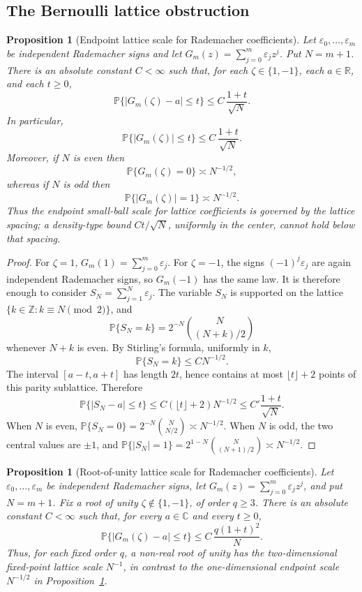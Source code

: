 \documentclass[11pt]{amsart}
\numberwithin{equation}{section}
\newtheorem{proposition}[theorem]{Proposition}
\theoremstyle{definition}
\theoremstyle{remark}
\newcommand{\C}{\mathbb C}
\newcommand{\Prob}{\mathbb P}
\newcommand{\abs}[1]{\left\lvert #1\right\rvert}
\begin{document}
\subsection{The Bernoulli lattice obstruction}
\begin{proposition}[Endpoint lattice scale for Rademacher coefficients]\label{prop:rademacher-endpoint}
Let \(\varepsilon_0,\ldots,\varepsilon_m\) be independent Rademacher signs and
let \(G_m(z)=\sum_{j=0}^m\varepsilon_jz^j\).  Put \(N=m+1\).  There is an
absolute constant \(C<\infty\) such that, for each \(\zeta\in\{1,-1\}\), each
\(a\in\mathbb R\), and each \(t\ge0\),
\[
  \Prob\{\abs{G_m(\zeta)-a}\le t\}\le C\,\frac{1+t}{\sqrt N}.
\]
In particular,
\[
  \Prob\{\abs{G_m(\zeta)}\le t\}\le C\,\frac{1+t}{\sqrt N}.
\]
Moreover, if \(N\) is even then
\[
  \Prob\{G_m(\zeta)=0\}\asymp N^{-1/2},
\]
whereas if \(N\) is odd then
\[
  \Prob\{\abs{G_m(\zeta)}=1\}\asymp N^{-1/2}.
\]
Thus the endpoint small-ball scale for lattice coefficients is governed by the
lattice spacing; a density-type bound \(Ct/\sqrt N\), uniformly in the center,
cannot hold below that spacing.
\end{proposition}

\begin{proof}
For \(\zeta=1\), \(G_m(1)=\sum_{j=0}^m\varepsilon_j\).  For \(\zeta=-1\), the
signs \((-1)^j\varepsilon_j\) are again independent Rademacher signs, so
\(G_m(-1)\) has the same law.  It is therefore enough to consider
\(S_N=\sum_{j=1}^N\varepsilon_j\).  The variable \(S_N\) is supported on the
lattice \(\{k\in\mathbb Z:k\equiv N \pmod 2\}\), and
\[
  \Prob\{S_N=k\}=2^{-N}\binom{N}{(N+k)/2}
\]
whenever \(N+k\) is even.  By Stirling's formula, uniformly in \(k\),
\[
  \Prob\{S_N=k\}\le C N^{-1/2}.
\]
The interval \([a-t,a+t]\) has length \(2t\), hence contains at most
\(\lfloor t\rfloor+2\) points of this parity sublattice.  Therefore
\[
  \Prob\{\abs{S_N-a}\le t\}
  \le C(\lfloor t\rfloor+2)N^{-1/2}
  \le C'\frac{1+t}{\sqrt N}.
\]
When \(N\) is even,
\(\Prob\{S_N=0\}=2^{-N}\binom{N}{N/2}\asymp N^{-1/2}\).  When \(N\) is odd,
the two central values are \(\pm1\), and
\(\Prob\{|S_N|=1\}=2^{1-N}\binom{N}{(N+1)/2}\asymp N^{-1/2}\).
\end{proof}

\begin{proposition}[Root-of-unity lattice scale for Rademacher coefficients]\label{prop:rademacher-root-unity}
Let \(\varepsilon_0,\ldots,\varepsilon_m\) be independent Rademacher signs,
let \(G_m(z)=\sum_{j=0}^m\varepsilon_jz^j\), and put \(N=m+1\).  Fix a
root of unity \(\zeta\notin\{1,-1\}\), of order \(q\ge3\).  There is an
absolute constant \(C<\infty\) such that, for every \(a\in\C\) and every
\(t\ge0\),
\[
  \Prob\{\abs{G_m(\zeta)-a}\le t\}
  \le C\,\frac{q(1+t)^2}{N}.
\]
Thus, for each fixed order \(q\), a non-real root of unity has the
two-dimensional fixed-point lattice scale \(N^{-1}\), in contrast to the
one-dimensional endpoint scale \(N^{-1/2}\) in
Proposition~\ref{prop:rademacher-endpoint}.
\end{proposition}
\end{document}
